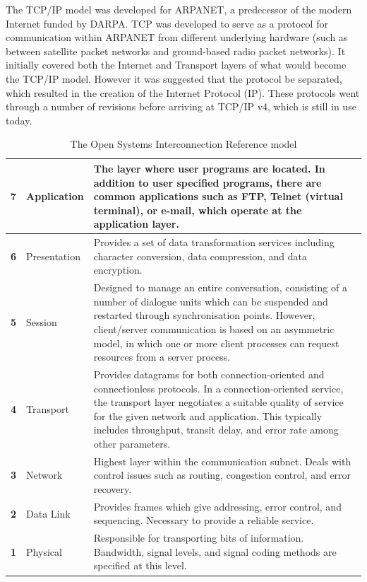 The TCP/IP model was developed for ARPANET, a predecessor of the modern Internet funded by DARPA. TCP was developed to serve as a protocol for communication within ARPANET from different underlying hardware (such as between satellite packet networks and ground-based radio packet networks). It initially covered both the Internet and Transport layers of what would become the TCP/IP model. However it was suggested that the protocol be separated, which resulted in the creation of the Internet Protocol (IP). These protocols went through a number of revisions before arriving at TCP/IP v4, which is still in use today.

\begin{table}[t]
  \caption{The Open Systems Interconnection Reference model \cite{networks01}}
  \begin{center}
    \begin{tabularx}{\textwidth}{|c|l|X|}
      \hline
      \textbf{7} & Application & The layer where user programs are located. In addition to user specified programs, there are common applications such as FTP, Telnet (virtual terminal), or e-mail, which operate at the application layer. \\ \hline
      \textbf{6} & Presentation & Provides a set of data transformation services including character conversion, data compression, and data encryption. \\ \hline
      \textbf{5} & Session & Designed to manage an entire conversation, consisting of a number of dialogue units which can be suspended and restarted through synchronisation points. However, \mbox{client/}server communication is based on an asymmetric model, in which one or more client processes can request resources from a server process. \\ \hline
      \textbf{4} & Transport & Provides datagrams for both connection-oriented and connectionless protocols. In a connection-oriented service, the transport layer negotiates a suitable quality of service for the given network and application. This typically includes throughput, transit delay, and error rate among other parameters. \\ \hline
      \textbf{3} & Network & Highest layer within the communication subnet. Deals with control issues such as routing, congestion control, and error recovery. \\ \hline
      \textbf{2} & Data Link & Provides frames which give addressing, error control, and sequencing. Necessary to provide a reliable service. \\ \hline
      \textbf{1} & Physical & Responsible for transporting bits of information. Bandwidth, signal levels, and signal coding methods are specified at this level. \\ \hline
    \end{tabularx}
  \end{center}
\label{osi_model}
\end{table}


